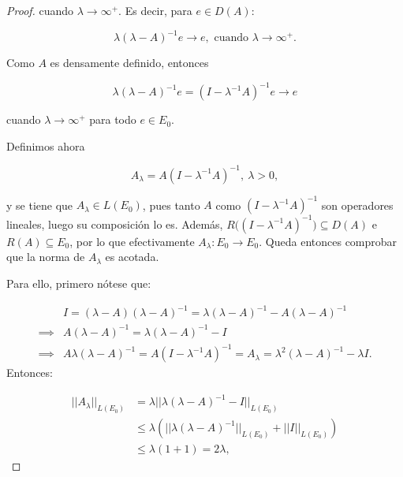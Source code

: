 \begin{proof}
    cuando $\lambda \rightarrow \infty^+$. Es decir, para $e \in D(A)$:

    \[\lambda(\lambda -A)^{-1}e \rightarrow e, \text{ cuando } \lambda \rightarrow \infty^+.\]

    Como $A$ es densamente definido, entonces

    \[\lambda(\lambda -A)^{-1}e = (I-\lambda^{-1}A)^{-1}e \rightarrow e\]

    cuando $\lambda \rightarrow \infty^+$ para todo $e \in E_0$.

    Definimos ahora

    \[A_\lambda = A(I - \lambda^{-1}A)^{-1}, \ \lambda > 0,\]

    y se tiene que $A_\lambda \in L(E_0)$, pues tanto $A$ como $(I - \lambda^{-1}A)^{-1}$ son operadores lineales, luego su composición lo es. Además, $R\big((I - \lambda^{-1}A)^{-1}\big) \subseteq D(A)$ e $R(A) \subseteq E_0$, por lo que efectivamente $A_\lambda : E_0 \rightarrow E_0$. Queda entonces comprobar que la norma de $A_\lambda$ es acotada.

    Para ello, primero nótese que:

    \begin{align*}
    &I = (\lambda - A)(\lambda - A)^{-1} = \lambda(\lambda - A)^{-1} - A(\lambda - A)^{-1}\\
    \implies& A(\lambda - A)^{-1} = \lambda(\lambda - A)^{-1} - I\\
    \implies& A \lambda (\lambda - A)^{-1} = A(I - \lambda^{-1}A)^{-1} = A_{\lambda} = \lambda^2 (\lambda - A)^{-1} - \lambda I.
    \end{align*}
    Entonces:

    \begin{align*}
        ||A_\lambda||_{L(E_0)} &= \lambda ||\lambda (\lambda - A)^{-1} - I||_{L(E_0)}\\
        &\leq \lambda \left (||\lambda (\lambda - A)^{-1}||_{L(E_0)} + ||I||_{L(E_0)} \right )\\
        &\leq \lambda (1 + 1) = 2\lambda,
    \end{align*}


\end{proof}
